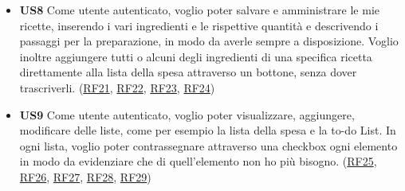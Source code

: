 \documentclass[a4paper,12pt]{article}
\begin{document}
\begin{itemize}
\begin{center}
\end{center}

\item \textbf {US8}  Come utente autenticato, voglio poter salvare e amministrare le mie ricette, inserendo i vari ingredienti e le rispettive quantità e descrivendo i passaggi per la preparazione, in modo da averle sempre a disposizione. Voglio inoltre aggiungere tutti o alcuni degli ingredienti di una specifica ricetta direttamente alla lista della spesa attraverso un bottone, senza dover trascriverli. (\hyperlink{RF21}{RF21}, \hyperlink{RF22}{RF22}, \hyperlink{RF23}{RF23}, \hyperlink{RF24}{RF24})

\begin{center}
\end{center}

\item \textbf {US9}  Come utente autenticato, voglio poter visualizzare, aggiungere, modificare delle liste, come per esempio la lista della spesa e la to-do List. In ogni lista, voglio poter contrassegnare attraverso una checkbox ogni elemento in modo da evidenziare che di quell'elemento non ho più bisogno. (\hyperlink{RF25}{RF25}, \hyperlink{RF26}{RF26}, \hyperlink{RF27}{RF27}, \hyperlink{RF28}{RF28}, \hyperlink{RF29}{RF29})

\begin{center}
\end{center}

\end{itemize}
\newpage
\end{document}
